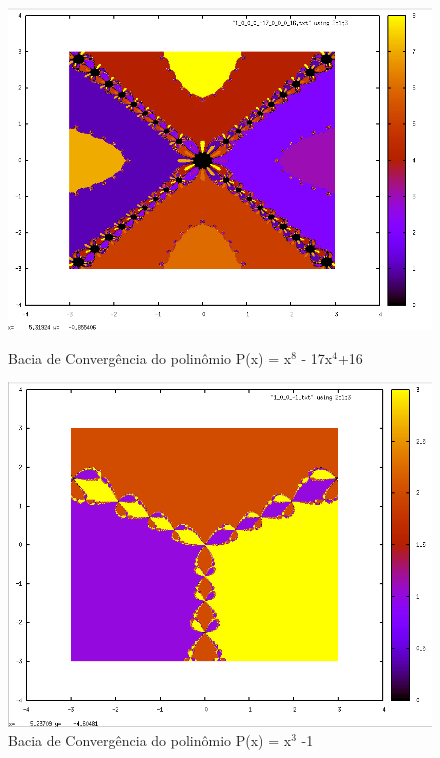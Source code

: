 \documentclass[11pt]{article}
\newcommand{\vsp}{\vspace{0.2in}}
\begin{document}
\begin{figure}[h!]
  \begin{center}
    \includegraphics[scale=0.45]{3}
    \caption{Bacia de Convergência do polinômio P(x) = x$^8$ - 17x$^4$+16}
    \vsp\vsp
    \includegraphics[scale=0.45]{4}
    \caption{Bacia de Convergência do polinômio P(x) = x$^3$ -1}
  \end{center}
\end{figure}
\end{document}
